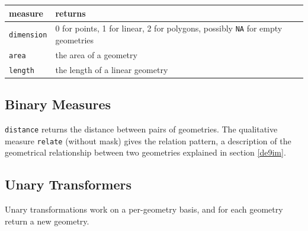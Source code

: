 \documentclass[]{book}
\begin{document}
\begin{longtable}[]{@{}ll@{}}
\toprule
\begin{minipage}[b]{0.24\columnwidth}\raggedright
measure\strut
\end{minipage} & \begin{minipage}[b]{0.70\columnwidth}\raggedright
returns\strut
\end{minipage}\tabularnewline
\midrule
\endhead
\begin{minipage}[t]{0.24\columnwidth}\raggedright
\texttt{dimension}\strut
\end{minipage} & \begin{minipage}[t]{0.70\columnwidth}\raggedright
0 for points, 1 for linear, 2 for polygons, possibly \texttt{NA} for empty geometries\strut
\end{minipage}\tabularnewline
\begin{minipage}[t]{0.24\columnwidth}\raggedright
\texttt{area}\strut
\end{minipage} & \begin{minipage}[t]{0.70\columnwidth}\raggedright
the area of a geometry\strut
\end{minipage}\tabularnewline
\begin{minipage}[t]{0.24\columnwidth}\raggedright
\texttt{length}\strut
\end{minipage} & \begin{minipage}[t]{0.70\columnwidth}\raggedright
the length of a linear geometry\strut
\end{minipage}\tabularnewline
\bottomrule
\end{longtable}

\hypertarget{binary-measures}{%
\subsection{Binary Measures}\label{binary-measures}}

\texttt{distance} returns the distance between pairs of geometries.
The qualitative measure \texttt{relate} (without mask) gives the relation
pattern, a description of the geometrical relationship between two
geometries explained in section \ref{de9im}.

\hypertarget{unary-transformers}{%
\subsection{Unary Transformers}\label{unary-transformers}}

Unary transformations work on a per-geometry basis, and for each geometry return a new geometry.
\end{document}
